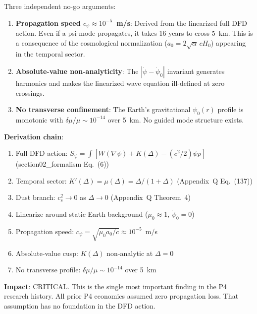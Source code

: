 \documentclass[11pt]{article}
\begin{document}
\begin{tcolorbox}[colback=red!5!white, colframe=red!60!black,
  title=\textbf{VERDICT: Distance-Independence is UNPROVABLE}]

Three independent no-go arguments:
\begin{enumerate}
\item \textbf{Propagation speed $c_\psi \approx 10^{-5}$~m/s}: Derived
  from the linearized full DFD action. Even if a psi-mode propagates,
  it takes 16 years to cross 5~km. This is a consequence of the
  cosmological normalization ($a_0 = 2\sqrt{\alpha}\,cH_0$) appearing
  in the temporal sector.

\item \textbf{Absolute-value non-analyticity}: The $|\dot\psi - \dot\psi_0|$
  invariant generates harmonics and makes the linearized wave equation
  ill-defined at zero crossings.

\item \textbf{No transverse confinement}: The Earth's gravitational
  $\psi_0(r)$ profile is monotonic with $\delta\mu/\mu \sim 10^{-14}$
  over 5~km. No guided mode structure exists.
\end{enumerate}

\textbf{Derivation chain}:
\begin{enumerate}[nosep]
\item Full DFD action: $S_\psi = \int[W(\nabla\psi) + K(\Delta) -
  (c^2/2)\psi\rho]$ (section02\_formalism Eq.~(6))
\item Temporal sector: $K'(\Delta) = \mu(\Delta) = \Delta/(1+\Delta)$
  (Appendix~Q Eq.~(137))
\item Dust branch: $c_s^2 \to 0$ as $\Delta \to 0$ (Appendix~Q Theorem~4)
\item Linearize around static Earth background ($\mu_0 \approx 1$,
  $\dot\psi_0 = 0$)
\item Propagation speed: $c_\psi = \sqrt{\mu_0 a_0/c} \approx 10^{-5}$~m/s
\item Absolute-value cusp: $K(\Delta)$ non-analytic at $\Delta = 0$
\item No transverse profile: $\delta\mu/\mu \sim 10^{-14}$ over 5~km
\end{enumerate}

\textbf{Impact}: CRITICAL. This is the single most important finding
in the P4 research history. All prior P4 economics assumed zero
propagation loss. That assumption has no foundation in the DFD action.
\end{tcolorbox}
\end{document}
